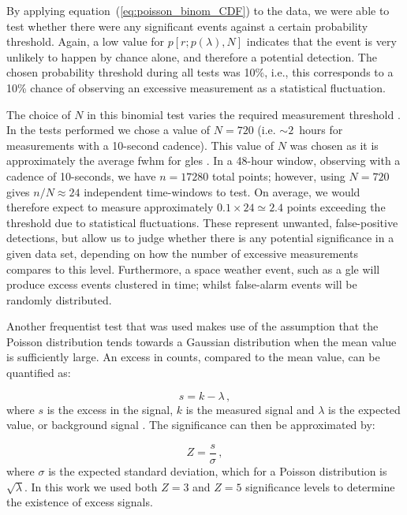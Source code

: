 By applying equation~(\ref{eq:poisson_binom_CDF}) to the data, we were able to test whether there were any significant events against a certain probability threshold. Again, a low value for $p[r; p(\lambda), N]$ indicates that the event is very unlikely to happen by chance alone, and therefore a potential detection. The chosen probability threshold during all tests was 10\%, i.e., this corresponds to a 10\% chance of observing an excessive measurement as a statistical fluctuation.

The choice of $N$ in this binomial test varies the required measurement threshold \citep{basu_asteroseismic_2017}. In the tests performed we chose a value of $N=720$ (i.e. $\sim2$~hours for measurements with a 10-second cadence). This value of $N$ was chosen as it is approximately the average \gls{fwhm} for \glspl{gle} \citep{strauss_pulse_2017}. In a 48-hour window, observing with a cadence of 10-seconds, we have $n=17280$ total points; however, using $N=720$ gives $n/N\approx24$ independent time-windows to test. On average, we would therefore expect to measure approximately $0.1 \times 24 \simeq 2.4$ points exceeding the threshold due to statistical fluctuations. These represent unwanted, false-positive detections, but allow us to judge whether there is any potential significance in a given data set, depending on how the number of excessive measurements compares to this level. Furthermore, a space weather event, such as a \gls{gle} will produce excess events clustered in time; whilst false-alarm events will be randomly distributed.


Another frequentist test that was used makes use of the assumption that the Poisson distribution tends towards a Gaussian distribution when the mean value is sufficiently large. An excess in counts, compared to the mean value, can be quantified as:

\begin{equation}
s = k - \lambda \, ,
\label{eq:poisson_excess}
\end{equation}
%
where $s$ is the excess in the signal, $k$ is the measured signal and $\lambda$ is the expected value, or background signal \citep{lista_statistical_2016}. The significance can then be approximated by:

\begin{equation}
Z = \frac{s}{\sigma} \, ,
\label{eq:poisson_significance}
\end{equation}
%
where $\sigma$ is the expected standard deviation, which for a Poisson distribution is $\sqrt{\lambda}$. In this work we used both $Z = 3$ and $Z = 5$ significance levels to determine the existence of excess signals.

